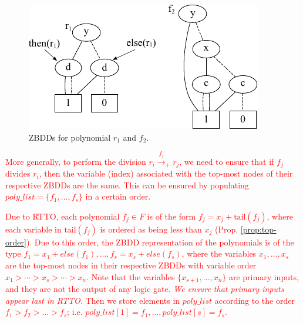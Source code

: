\begin{figure}[hbt]
\centering
\includegraphics[scale=1]{Preliminaries-Theory/r1_f2.pdf}
\caption{ZBDDs for polynomial $r_1$ and $f_2$.}
\label{f2}
\end{figure}

\textcolor{red}{
More generally, to perform the division $r_i \xrightarrow{f_j}_+ r_j$, 
we need to ensure that if $f_j$ divides $r_i$, then the variable
(index) associated with the top-most nodes of  their respective ZBDDs
are the same. This can be ensured by populating
$poly\_list=\{f_1,\dots,f_s\}$ in a certain order.}

\textcolor{red}{Due to RTTO, each polynomial $f_j \in F$ is of the form $f_j = x_j +
\text{tail}(f_j)$, where each variable in $\text{tail}(f_j)$
is ordered as being less than $x_j$ (Prop. \ref{prop:top-order}). Due to this order,
the ZBDD representation of the polynomials is of the type $f_1= x_1 +
else(f_1), \dots, f_s= x_s + else(f_s)$, where the variables $x_1,\dots,x_s$ are the 
top-most nodes in their respective ZBDDs with variable order $x_1 >
\cdots > x_s > \cdots > x_n$. Note that the variables
$\{x_{s+1},\dots,x_{n}\}$ are primary inputs, and they are not the output
of any logic gate. {\it We ensure that primary inputs appear last in RTTO.}
Then we store elements in $poly\_list$ according to the order
$f_1 > f_2 > \dots > f_s$; i.e. $poly\_list[1] = f_1,
\dots,poly\_list[s] = f_s$. }

